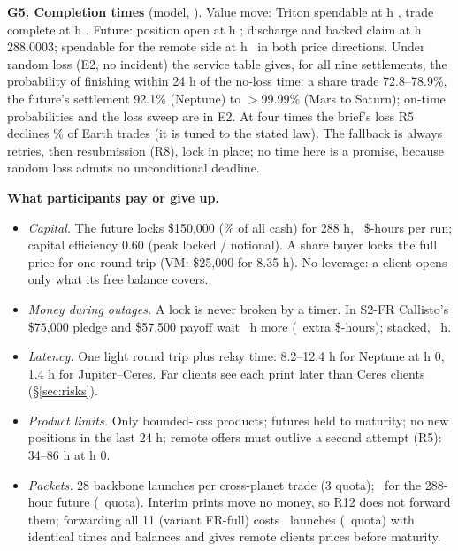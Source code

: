 \textbf{G5. Completion times} (model, \conditional). Value move: Triton spendable at h \SimVMCommit, trade complete at h \SimVMComplete. Future: position open at
h \SimFutOpen; discharge and backed claim at h 288.0003; spendable for the remote side at h \SimFutSpendable\ in both price directions. Under random loss (E2, no
incident) the service table gives, for all nine settlements, the probability of finishing within 24 h of the no-loss time: a share trade 72.8--78.9\%, the future's settlement
92.1\% (Neptune) to $>$99.99\% (Mars to Saturn); on-time probabilities and the loss sweep are in E2. At four times the brief's loss R5 declines
\EtwoSweepLossFourDecline\% of Earth trades (it is tuned to the stated law). The fallback is always retries, then resubmission (R8), lock in place; no time here is a
promise, because random loss admits no unconditional deadline.

\textbf{What participants pay or give up.}
\begin{itemize}
\item \emph{Capital.} The future locks \$150{,}000 (\SimFutUtil\% of all cash) for 288 h, \SimFutDollarHours\ \$-hours per run; capital efficiency 0.60 (peak locked /
notional). A share buyer locks the full price for one round trip (VM: \$25{,}000 for 8.35 h). No leverage: a client opens only what its free balance covers.
\item \emph{Money during outages.} A lock is never broken by a timer. In S2-FR Callisto's \$75{,}000 pledge and \$57{,}500 payoff wait \SimSTwoFRLost\ h more
(\SimSTwoFRExtraDollarHours\ extra \$-hours); stacked, \SimStackLost\ h.
\item \emph{Latency.} One light round trip plus relay time: 8.2--12.4 h for Neptune at h 0, 1.4 h for Jupiter--Ceres. Far clients see each print later than Ceres clients
(\S\ref{sec:risks}).
\item \emph{Product limits.} Only bounded-loss products; futures held to maturity; no new positions in the last 24 h; remote offers must outlive a second attempt (R5):
34--86 h at h 0.
\item \emph{Packets.} 28 backbone launches per cross-planet trade (3 quota); \SimFutPackets\ for the 288-hour future (\SimFutQuota\ quota). Interim prints move no money, so R12 does not forward them; forwarding all 11 (variant FR-full) costs \SimFullLaunches\ launches (\SimFullQuota\ quota) with identical times and balances and gives remote clients prices before maturity.
\end{itemize}

